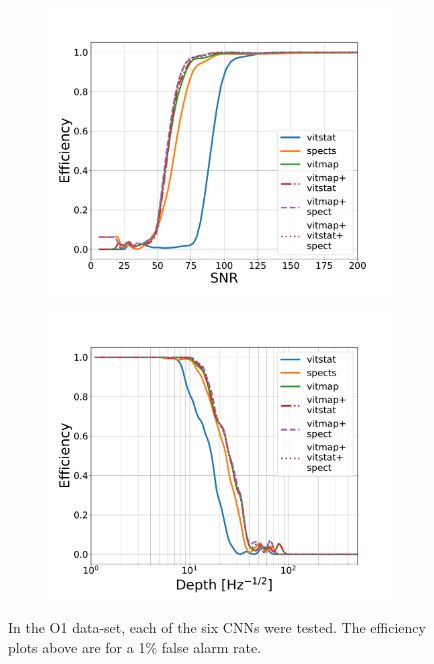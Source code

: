 \begin{figure}
	\begin{subfigure}[h]{0.5\textwidth}
		\includegraphics[width=\columnwidth]{C4_cnn/o1_snr_eff.pdf}
		\label{machineresults:snr_o1}
	\end{subfigure}
	\begin{subfigure}[h]{0.5\textwidth}
		\includegraphics[width=\columnwidth]{C4_cnn/o1_depth_eff.pdf}
		\label{machine:results:depth_o1}
	\end{subfigure}
	\caption{\label{machine:results:o1} In the O1 data-set, each of the six \acp{CNN} were tested. The efficiency plots above are for a 1\% false alarm rate.  }
	
\end{figure}

